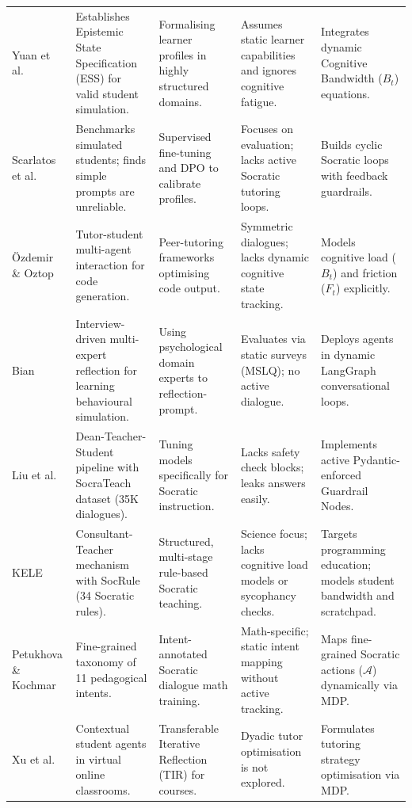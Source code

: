 \begin{xltabular}{\linewidth}{>{\hsize}Y >{\hsize}Y >{\hsize}Y >{\hsize}Y >{\hsize}Y}
Yuan et al. \cite{yuan2026towards} & Establishes Epistemic State Specification (ESS) for valid student simulation. & Formalising learner profiles in highly structured domains. & Assumes static learner capabilities and ignores cognitive fatigue. & Integrates dynamic Cognitive Bandwidth ($B_t$) equations. \\
\addlinespace
Scarlatos et al. \cite{scarlatos2026simulated} & Benchmarks simulated students; finds simple prompts are unreliable. & Supervised fine-tuning and DPO to calibrate profiles. & Focuses on evaluation; lacks active Socratic tutoring loops. & Builds cyclic Socratic loops with feedback guardrails. \\
\addlinespace
\"{O}zdemir \& Oztop \cite{ozdemir2026enhancing} & Tutor-student multi-agent interaction for code generation. & Peer-tutoring frameworks optimising code output. & Symmetric dialogues; lacks dynamic cognitive state tracking. & Models cognitive load ($B_t$) and friction ($F_t$) explicitly. \\
\addlinespace
Bian \cite{bian2026generative} & Interview-driven multi-expert reflection for learning behavioural simulation. & Using psychological domain experts to reflection-prompt. & Evaluates via static surveys (MSLQ); no active dialogue. & Deploys agents in dynamic LangGraph conversational loops. \\
\addlinespace
Liu et al. \cite{liu2024socraticlm} & Dean-Teacher-Student pipeline with SocraTeach dataset (35K dialogues). & Tuning models specifically for Socratic instruction. & Lacks safety check blocks; leaks answers easily. & Implements active Pydantic-enforced Guardrail Nodes. \\
\addlinespace
KELE \cite{peng2025kele} & Consultant-Teacher mechanism with SocRule (34 Socratic rules). & Structured, multi-stage rule-based Socratic teaching. & Science focus; lacks cognitive load models or sycophancy checks. & Targets programming education; models student bandwidth and scratchpad. \\
\addlinespace
Petukhova \& Kochmar \cite{petukhova2025intent} & Fine-grained taxonomy of 11 pedagogical intents. & Intent-annotated Socratic dialogue math training. & Math-specific; static intent mapping without active tracking. & Maps fine-grained Socratic actions ($\mathcal{A}$) dynamically via MDP. \\
\addlinespace
Xu et al. \cite{xu2025classroom} & Contextual student agents in virtual online classrooms. & Transferable Iterative Reflection (TIR) for courses. & Dyadic tutor optimisation is not explored. & Formulates tutoring strategy optimisation via MDP. \\

\end{xltabular}
